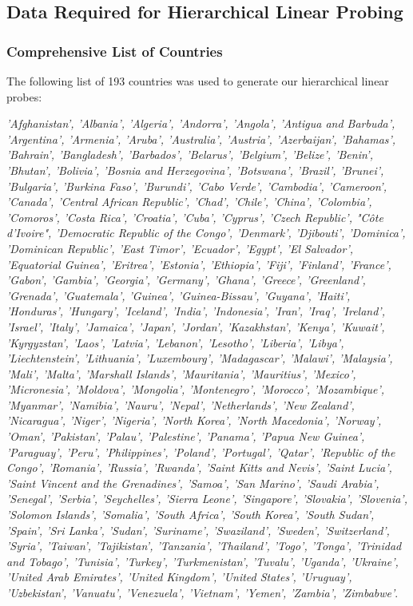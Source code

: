 \documentclass{article}
\begin{document}
\subsection{Data Required for Hierarchical Linear Probing}

\subsubsection{Comprehensive List of Countries}
\label{app:listcountries}

The following list of 193 countries was used to generate our hierarchical linear probes:

\textit{'Afghanistan',
 'Albania',
 'Algeria',
 'Andorra',
 'Angola',
 'Antigua and Barbuda',
 'Argentina',
 'Armenia',
 'Aruba',
 'Australia',
 'Austria',
 'Azerbaijan',
 'Bahamas',
 'Bahrain',
 'Bangladesh',
 'Barbados',
 'Belarus',
 'Belgium',
 'Belize',
 'Benin',
 'Bhutan',
 'Bolivia',
 'Bosnia and Herzegovina',
 'Botswana',
 'Brazil',
 'Brunei',
 'Bulgaria',
 'Burkina Faso',
 'Burundi',
 'Cabo Verde',
 'Cambodia',
 'Cameroon',
 'Canada',
 'Central African Republic',
 'Chad',
 'Chile',
 'China',
 'Colombia',
 'Comoros',
 'Costa Rica',
 'Croatia',
 'Cuba',
 'Cyprus',
 'Czech Republic',
 "Côte d'Ivoire",
 'Democratic Republic of the Congo',
 'Denmark',
 'Djibouti',
 'Dominica',
 'Dominican Republic',
 'East Timor',
 'Ecuador',
 'Egypt',
 'El Salvador',
 'Equatorial Guinea',
 'Eritrea',
 'Estonia',
 'Ethiopia',
 'Fiji',
 'Finland',
 'France',
 'Gabon',
 'Gambia',
 'Georgia',
 'Germany',
 'Ghana',
 'Greece',
 'Greenland',
 'Grenada',
 'Guatemala',
 'Guinea',
 'Guinea-Bissau',
 'Guyana',
 'Haiti',
 'Honduras',
 'Hungary',
 'Iceland',
 'India',
 'Indonesia',
 'Iran',
 'Iraq',
 'Ireland',
 'Israel',
 'Italy',
 'Jamaica',
 'Japan',
 'Jordan',
 'Kazakhstan',
 'Kenya',
 'Kuwait',
 'Kyrgyzstan',
 'Laos',
 'Latvia',
 'Lebanon',
 'Lesotho',
 'Liberia',
 'Libya',
 'Liechtenstein',
 'Lithuania',
 'Luxembourg',
 'Madagascar',
 'Malawi',
 'Malaysia',
 'Mali',
 'Malta',
 'Marshall Islands',
 'Mauritania',
 'Mauritius',
 'Mexico',
 'Micronesia',
 'Moldova',
 'Mongolia',
 'Montenegro',
 'Morocco',
 'Mozambique',
 'Myanmar',
 'Namibia',
 'Nauru',
 'Nepal',
 'Netherlands',
 'New Zealand',
 'Nicaragua',
 'Niger',
 'Nigeria',
 'North Korea',
 'North Macedonia',
 'Norway',
 'Oman',
 'Pakistan',
 'Palau',
 'Palestine',
 'Panama',
 'Papua New Guinea',
 'Paraguay',
 'Peru',
 'Philippines',
 'Poland',
 'Portugal',
 'Qatar',
 'Republic of the Congo',
 'Romania',
 'Russia',
 'Rwanda',
 'Saint Kitts and Nevis',
 'Saint Lucia',
 'Saint Vincent and the Grenadines',
 'Samoa',
 'San Marino',
 'Saudi Arabia',
 'Senegal',
 'Serbia',
 'Seychelles',
 'Sierra Leone',
 'Singapore',
 'Slovakia',
 'Slovenia',
 'Solomon Islands',
 'Somalia',
 'South Africa',
 'South Korea',
 'South Sudan',
 'Spain',
 'Sri Lanka',
 'Sudan',
 'Suriname',
 'Swaziland',
 'Sweden',
 'Switzerland',
 'Syria',
 'Taiwan',
 'Tajikistan',
 'Tanzania',
 'Thailand',
 'Togo',
 'Tonga',
 'Trinidad and Tobago',
 'Tunisia',
 'Turkey',
 'Turkmenistan',
 'Tuvalu',
 'Uganda',
 'Ukraine',
 'United Arab Emirates',
 'United Kingdom',
 'United States',
 'Uruguay',
 'Uzbekistan',
 'Vanuatu',
 'Venezuela',
 'Vietnam',
 'Yemen',
 'Zambia',
 'Zimbabwe'}.
\end{document}
